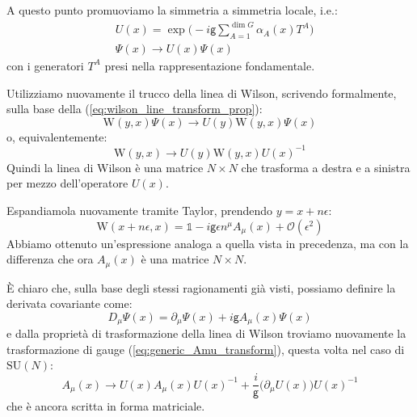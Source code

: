 \documentclass[../main.tex]{subfiles}
\begin{document}
A questo punto promuoviamo la simmetria a simmetria locale, i.e.:
\[
\boxed{\begin{aligned}
    &U(x) = \exp\bigg(-i\mathsf{g}\sum_{A=1}^{\dim G}\alpha_A(x)T^A\bigg)\\
    &\Psi(x)\rightarrow U(x)\Psi(x)
\end{aligned}}
\]
con i generatori $T^A$ presi nella rappresentazione fondamentale.

Utilizziamo nuovamente il trucco della linea di Wilson, scrivendo formalmente, sulla base della (\ref{eq:wilson_line_transform_prop}):
\[
\textrm{W}(y,x)\Psi(x) \rightarrow U(y)\textrm{W}(y,x)\Psi(x)
\]
o, equivalentemente:
\[
\textrm{W}(y,x) \rightarrow U(y)\textrm{W}(y,x)U(x)^{-1}
\]
Quindi la linea di Wilson è una matrice $N\times N$ che trasforma a destra e a sinistra per mezzo dell'operatore $U(x)$.

Espandiamola nuovamente tramite Taylor, prendendo $y=x+n\epsilon$:
\[
\textrm{W}(x+n\epsilon,x) = \mathbb 1 - i\mathsf{g}\epsilon n^\mu A_\mu(x)+\mathscr{O}(\epsilon^2)
\]
Abbiamo ottenuto un'espressione analoga a quella vista in precedenza, ma con la differenza che ora $A_\mu(x)$ è una matrice $N\times N$.

È chiaro che, sulla base degli stessi ragionamenti già visti, possiamo definire la derivata covariante come:
\[
D_\mu\Psi(x) = \partial_\mu\Psi(x) + i\mathsf{g}A_\mu(x)\Psi(x)
\]
e dalla proprietà di trasformazione della linea di Wilson troviamo nuovamente la trasformazione di gauge (\ref{eq:generic_Amu_transform}), questa volta nel caso di $\textrm{SU}(N)$:
\begin{equation}
    A_\mu(x) \rightarrow U(x)A_\mu(x) U(x)^{-1} + \frac{i}{\mathsf{g}}\big(\partial_\mu U(x)\big) U(x)^{-1}
    \label{eq:SUN_Amu_gauge_transform}
\end{equation}
che è ancora scritta in forma matriciale. 
\end{document}
